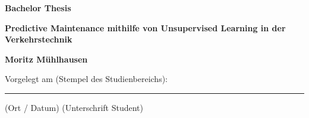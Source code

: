 %

%
\newcommand{\Bearbeiter}{Moritz Mühlhausen}
\newcommand{\Thema}{Predictive Maintenance mithilfe von Unsupervised Learning in der Verkehrstechnik}
\newcommand{\Referent}{Prof.\ Dr.-Ing. Michael Voigt}
\newcommand{\Korreferent}{M. Sc. Felix Becker, Vitronic Machine Vision GmbH}
%
\thispagestyle{empty} 
%
\vspace{-20mm}
\begin{minipage}[t]{8cm}  
\end{minipage}
\hfill
{}
\vspace{30mm}
\begin{center}{\Huge\bf Bachelor Thesis} \par
\vspace{20mm}
{\LARGE\bf  \Thema} \par
\vspace{16mm}
{\LARGE\bf  \Bearbeiter} \par
\end{center}
% 
\vspace{15mm}
\begin{flushright}
    Vorgelegt am (Stempel des Studienbereichs): \\
    \vspace{20mm} %
    \rule[0ex]{\textwidth}{0.4pt} \hspace{5mm} (Ort / Datum) \hspace{30ex} (Unterschrift Student)
\end{flushright}
